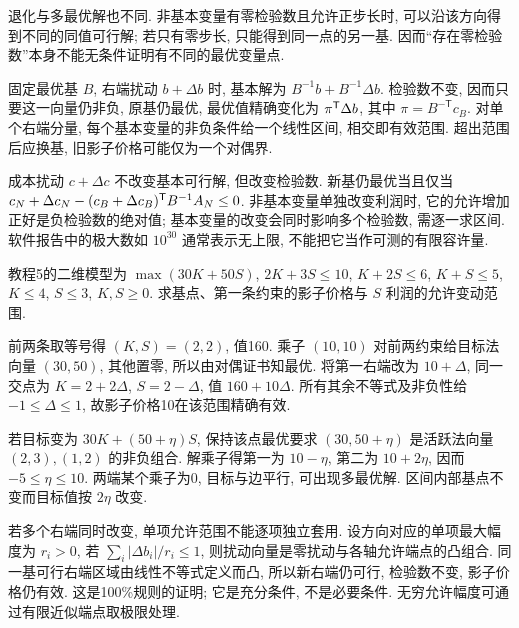 退化与多最优解也不同. 非基本变量有零检验数且允许正步长时, 可以沿该方向得到不同的同值可行解; 若只有零步长, 只能得到同一点的另一基. 因而“存在零检验数”本身不能无条件证明有不同的最优变量点.

固定最优基 $B$, 右端扰动 $b+\Delta b$ 时, 基本解为 $B^{-1}b+B^{-1}\Delta b$. 检验数不变, 因而只要这一向量仍非负, 原基仍最优, 最优值精确变化为 $\pi^{\mathsf T}\Delta b$, 其中 $\pi=B^{-\mathsf T}c_B$. 对单个右端分量, 每个基本变量的非负条件给一个线性区间, 相交即有效范围. 超出范围后应换基, 旧影子价格可能仅为一个对偶界.

成本扰动 $c+\Delta c$ 不改变基本可行解, 但改变检验数. 新基仍最优当且仅当 $c_N+\Delta c_N-(c_B+\Delta c_B)^{\mathsf T} B^{-1}A_N\le0$. 非基本变量单独改变利润时, 它的允许增加正好是负检验数的绝对值; 基本变量的改变会同时影响多个检验数, 需逐一求区间. 软件报告中的极大数如 $10^{30}$ 通常表示无上限, 不能把它当作可测的有限容许量.

\begin{example}
教程5的二维模型为 $\max(30K+50S)$, $2K+3S\le10$, $K+2S\le6$, $K+S\le5$, $K\le4$, $S\le3$, $K,S\ge0$. 求基点、第一条约束的影子价格与 $S$ 利润的允许变动范围.
\end{example}
\begin{solution}
前两条取等号得 $(K,S)=(2,2)$, 值160. 乘子 $(10,10)$ 对前两约束给目标法向量 $(30,50)$, 其他置零, 所以由对偶证书知最优. 将第一右端改为 $10+\Delta$, 同一交点为 $K=2+2\Delta$, $S=2-\Delta$, 值 $160+10\Delta$. 所有其余不等式及非负性给 $-1\le\Delta\le1$, 故影子价格10在该范围精确有效.

若目标变为 $30K+(50+\eta)S$, 保持该点最优要求 $(30,50+\eta)$ 是活跃法向量 $(2,3),(1,2)$ 的非负组合. 解乘子得第一为 $10-\eta$, 第二为 $10+2\eta$, 因而 $-5\le\eta\le10$. 两端某个乘子为0, 目标与边平行, 可出现多最优解. 区间内部基点不变而目标值按 $2\eta$ 改变.
\end{solution}

若多个右端同时改变, 单项允许范围不能逐项独立套用. 设方向对应的单项最大幅度为 $r_i>0$, 若 $\sum_i|\Delta b_i|/r_i\le1$, 则扰动向量是零扰动与各轴允许端点的凸组合. 同一基可行右端区域由线性不等式定义而凸, 所以新右端仍可行, 检验数不变, 影子价格仍有效. 这是100\%规则的证明; 它是充分条件, 不是必要条件. 无穷允许幅度可通过有限近似端点取极限处理.

